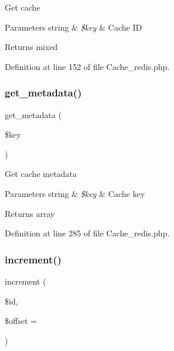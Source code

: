 Get cache


\begin{DoxyParams}[1]{Parameters}
string & {\em \$key} & Cache ID \\
\hline
\end{DoxyParams}
\begin{DoxyReturn}{Returns}
mixed 
\end{DoxyReturn}


Definition at line 152 of file Cache\+\_\+redis.\+php.

\mbox{\label{class_c_i___cache__redis_ae0041475d947465622dfcef1fc53e43d}} 
\subsubsection{\texorpdfstring{get\_metadata()}{get\_metadata()}}
{\footnotesize\ttfamily get\+\_\+metadata (\begin{DoxyParamCaption}\item[{}]{\$key }\end{DoxyParamCaption})}

Get cache metadata


\begin{DoxyParams}[1]{Parameters}
string & {\em \$key} & Cache key \\
\hline
\end{DoxyParams}
\begin{DoxyReturn}{Returns}
array 
\end{DoxyReturn}


Definition at line 285 of file Cache\+\_\+redis.\+php.

\mbox{\label{class_c_i___cache__redis_a2f07a4e09b57f4460d49852497d1808f}} 
\subsubsection{\texorpdfstring{increment()}{increment()}}
{\footnotesize\ttfamily increment (\begin{DoxyParamCaption}\item[{}]{\$id,  }\item[{}]{\$offset = {} }\end{DoxyParamCaption})}

